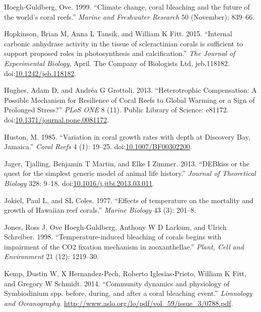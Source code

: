 \documentclass[]{elsarticle} %
\begin{document}
\hypertarget{ref-HoeghGuldberg:1999p4222}{}
Hoegh-Guldberg, Ove. 1999. ``Climate change, coral bleaching and the
future of the world's coral reefs.'' \emph{Marine and Freshwater
Research} 50 (November): 839--66.

\hypertarget{ref-Hopkinson:2015ev}{}
Hopkinson, Brian M, Anna L Tansik, and William K Fitt. 2015. ``Internal
carbonic anhydrase activity in the tissue of scleractinian corals is
sufficient to support proposed roles in photosynthesis and
calcification.'' \emph{The Journal of Experimental Biology}, April. The
Company of Biologists Ltd, jeb.118182.
doi:\href{https://doi.org/10.1242/jeb.118182}{10.1242/jeb.118182}.

\hypertarget{ref-Hughes:2013hd}{}
Hughes, Adam D, and Andréa G Grottoli. 2013. ``Heterotrophic
Compensation: A Possible Mechanism for Resilience of Coral Reefs to
Global Warming or a Sign of Prolonged Stress?'' \emph{PLoS ONE} 8 (11).
Public Library of Science: e81172.
doi:\href{https://doi.org/10.1371/journal.pone.0081172}{10.1371/journal.pone.0081172}.

\hypertarget{ref-Huston:1985ec}{}
Huston, M. 1985. ``Variation in coral growth rates with depth at
Discovery Bay, Jamaica.'' \emph{Coral Reefs} 4 (1): 19--25.
doi:\href{https://doi.org/10.1007/BF00302200}{10.1007/BF00302200}.

\hypertarget{ref-Jager:2013bj}{}
Jager, Tjalling, Benjamin T Martin, and Elke I Zimmer. 2013. ``DEBkiss
or the quest for the simplest generic model of animal life history.''
\emph{Journal of Theoretical Biology} 328: 9--18.
doi:\href{https://doi.org/10.1016/j.jtbi.2013.03.011}{10.1016/j.jtbi.2013.03.011}.

\hypertarget{ref-Jokiel:1977p7353}{}
Jokiel, Paul L, and SL Coles. 1977. ``Effects of temperature on the
mortality and growth of Hawaiian reef corals.'' \emph{Marine Biology} 43
(3): 201--8.

\hypertarget{ref-Jones:1998p3572}{}
Jones, Ross J, Ove Hoegh-Guldberg, Anthony W D Larkum, and Ulrich
Schreiber. 1998. ``Temperature-induced bleaching of corals begins with
impairment of the CO2 fixation mechanism in zooxanthellae.''
\emph{Plant, Cell and Environment} 21 (12): 1219--30.

\hypertarget{ref-Kemp:2014ug}{}
Kemp, Dustin W, X Hernandez-Pech, Roberto Iglesias-Prieto, William K
Fitt, and Gregory W Schmidt. 2014. ``Community dynamics and physiology
of Symbiodinium spp. before, during, and after a coral bleaching
event.'' \emph{Limnology and Oceanography}.
\url{http://www.aslo.org/lo/pdf/vol_59/issue_3/0788.pdf}.
\end{document}
